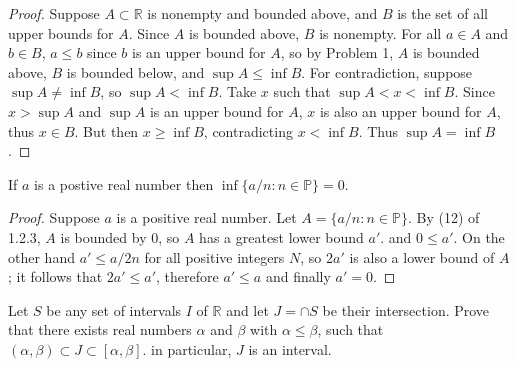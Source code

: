 \begin{proof}
    Suppose $A \subset \mathbb{R}$ is nonempty and bounded above, and $B$
    is the set of all upper bounds for $A$.
    Since $A$ is bounded above, $B$ is nonempty.
    For all $a \in A$ and $b \in B$, $a \le b$ since $b$ is an upper bound for $A$,
        so by Problem 1, $A$ is bounded above, $B$ is bounded below, and $\sup A \le \inf B$.
    For contradiction, suppose $\sup A \ne \inf B$, so $\sup A < \inf B$.
    Take $x$ such that $\sup A < x < \inf B$.
    Since $x > \sup A$ and $\sup A$ is an upper bound for $A$, $x$ is also an upper bound for $A$,
        thus $x \in B$.
    But then $x \ge \inf B$, contradicting $x < \inf B$.
    Thus $\sup A = \inf B$.
\end{proof}

\begin{tcolorbox}[title=Problem 4, breakable]
    If $a$ is a postive real number then 
    $\inf \{a/n : n \in \mathbb{P}\} = 0$.
\end{tcolorbox}

\begin{proof}
    Suppose $a$ is a positive real number.
    Let $A = \{a/n : n \in \mathbb{P}\}$.
    By (12) of 1.2.3, $A$ is bounded by $0$, so $A$ has a greatest lower bound $a'$.
        and $0 \le a'$. 
    On the other hand $a' \le a/2 n$ for all positive integers $N$, so 
        $2a'$ is also a lower bound of $A$;
        it follows that $2a' \le a'$, therefore $a' \le a$ and finally $a' = 0$.
\end{proof}

\begin{tcolorbox}[title=Problem 6, breakable]
    Let $S$ be any set of intervals $I$ of $\mathbb{R}$
    and let $J = \cap S$ be their intersection.
    Prove that there exists real numbers $\alpha$ and $\beta$
        with $\alpha \le \beta$, such that 
        $(\alpha, \beta) \subset J \subset [\alpha, \beta]$.
        in particular, $J$ is an interval.
\end{tcolorbox}

